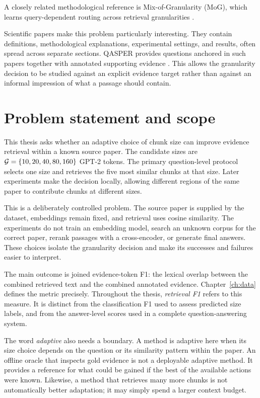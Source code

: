 A closely related methodological reference is Mix-of-Granularity (MoG),
which learns query-dependent routing across retrieval granularities
\cite{zhong-etal-2025-mix}.

Scientific papers make this problem particularly interesting. They
contain definitions, methodological explanations, experimental settings,
and results, often spread across separate sections. QASPER provides
questions anchored in such papers together with annotated supporting
evidence \cite{dasigi2021qasper}. This allows the granularity decision to
be studied against an explicit evidence target rather than against an
informal impression of what a passage should contain.

\section{Problem statement and scope}
This thesis asks whether an adaptive choice of chunk size can improve
evidence retrieval within a known source paper. The candidate sizes are
$\mathcal{G}=\{10,20,40,80,160\}$ GPT-2 tokens. The primary
question-level protocol selects one size and retrieves the five most
similar chunks at that size. Later experiments make the decision locally,
allowing different regions of the same paper to contribute chunks at
different sizes.

This is a deliberately controlled problem. The source paper is supplied
by the dataset, embeddings remain fixed, and retrieval uses cosine
similarity. The experiments do not train an embedding model, search an
unknown corpus for the correct paper, rerank passages with a cross-encoder,
or generate final answers. These choices isolate the granularity decision
and make its successes and failures easier to interpret.

The main outcome is joined evidence-token F1: the lexical overlap between
the combined retrieved text and the combined annotated evidence.
Chapter~\ref{ch:data} defines the metric precisely. Throughout the thesis,
\emph{retrieval F1} refers to this measure. It is distinct from the
classification F1 used to assess predicted size labels, and from the
answer-level scores used in a complete question-answering system.

The word \emph{adaptive} also needs a boundary. A method is adaptive here
when its size choice depends on the question or its similarity pattern
within the paper. An offline oracle that inspects gold evidence is not
a deployable adaptive method. It provides a reference for what could be
gained if the best of the available actions were known. Likewise, a
method that retrieves many more chunks is not automatically better
adaptation; it may simply spend a larger context budget.

